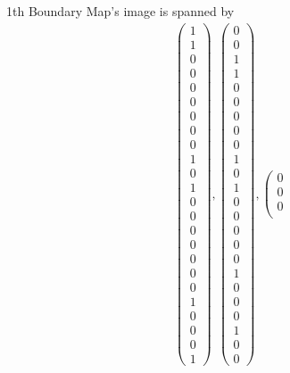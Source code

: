\documentclass[8pt]{article}
\begin{document}
\centering
1th Boundary Map's image is spanned by
 \begin{align*} \left(\begin{array}{r}
1 \\
1 \\
0 \\
0 \\
0 \\
0 \\
0 \\
0 \\
0 \\
1 \\
0 \\
1 \\
0 \\
0 \\
0 \\
0 \\
0 \\
0 \\
0 \\
1 \\
0 \\
0 \\
0 \\
1
\end{array}\right) ,
 \left(\begin{array}{r}
0 \\
0 \\
1 \\
1 \\
0 \\
0 \\
0 \\
0 \\
0 \\
1 \\
0 \\
1 \\
0 \\
0 \\
0 \\
0 \\
0 \\
1 \\
0 \\
0 \\
0 \\
1 \\
0 \\
0
\end{array}\right) ,
 \left(\begin{array}{r}
0 \\
0 \\
0 \\

\end{array}
\end{align*}
\end{document}
